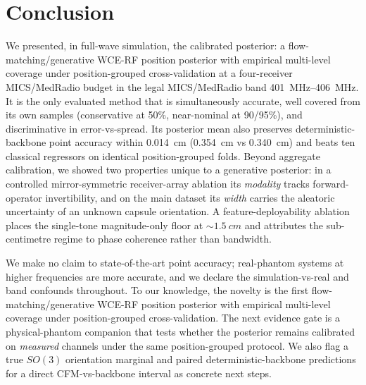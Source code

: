 \section{Conclusion}\label{sec:conclusion}

We presented, in full-wave simulation, the calibrated posterior: a
flow-matching/generative WCE-RF position posterior with empirical multi-level
coverage under position-grouped cross-validation at a four-receiver MICS/MedRadio
budget in the legal MICS/MedRadio band \SIrange{401}{406}{MHz}. It is the only
evaluated method that is simultaneously accurate, well covered from its own
samples (conservative at 50\%, near-nominal at 90/95\%), and discriminative in
error-vs-spread. Its posterior mean also preserves deterministic-backbone point
accuracy within \SI{0.014}{cm} (\SI{0.354}{cm} vs \SI{0.340}{cm}) and beats ten
classical regressors on identical position-grouped folds. Beyond aggregate
calibration, we showed two properties unique to a generative posterior: in a
controlled mirror-symmetric receiver-array ablation its \emph{modality} tracks
forward-operator invertibility, and on the main dataset its \emph{width} carries
the aleatoric uncertainty of an unknown capsule orientation. A
feature-deployability ablation places the
single-tone magnitude-only floor at ${\sim}\SI{1.5}{cm}$ and attributes the
sub-centimetre regime to phase coherence rather than bandwidth.

We make no claim to state-of-the-art point accuracy; real-phantom systems at
higher frequencies are more accurate, and we declare the simulation-vs-real and
band confounds throughout. To our knowledge, the novelty is the first
flow-matching/generative WCE-RF position posterior with empirical multi-level
coverage under position-grouped cross-validation. The next evidence gate is a
physical-phantom companion that tests whether the posterior remains calibrated on
\emph{measured} channels under the same position-grouped protocol. We also flag
a true $SO(3)$ orientation marginal and paired deterministic-backbone predictions
for a direct CFM-vs-backbone interval as concrete next steps.
